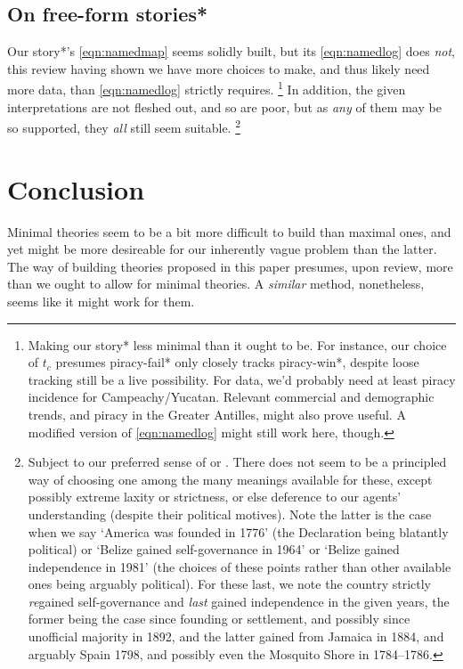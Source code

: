 	\subsection{On free-form stories*}
	\label{ss:onfreestories}
		Our story*'s \ref{eqn:namedmap} seems solidly built, but its \ref{eqn:namedlog} does \emph{not}, this review having shown we have more choices to make, and thus likely need more data, than \ref{eqn:namedlog} strictly requires.%
		\footnote{Making our story* less minimal than it ought to be. For instance, our choice of \(t_c\) presumes piracy-fail* only closely tracks piracy-win*, despite loose tracking still be a live possibility. For data, we'd probably need at least piracy incidence  for Campeachy/Yucatan. Relevant commercial and demographic trends, and piracy in the Greater Antilles, might also prove useful. A modified version of \ref{eqn:namedlog} might still work here, though.}
		In addition, the given interpretations are not fleshed out, and so are poor, but as \emph{any} of them may be so supported, they \emph{all} still seem suitable.%
		\footnote{Subject to our preferred sense of  or . There does not seem to be a principled way of choosing one among the many meanings available for these, except possibly extreme laxity or strictness, or else deference to our agents' understanding (despite their political motives). Note the latter is the case when we say `America was founded in 1776' (the Declaration being blatantly political) or `Belize gained self-governance in 1964' or `Belize gained independence in 1981' (the choices of these points rather than other available ones being arguably political). For these last, we note the country strictly \emph{re}gained self-governance and \emph{last} gained independence in the given years, the former being the case since founding or settlement, and possibly since unofficial majority in 1892, and the latter gained from Jamaica in 1884, and arguably Spain 1798, and possibly even the Mosquito Shore in 1784--1786.} %
%
%
%
\section{Conclusion}
\label{s:concl}
	Minimal theories seem to be a bit more difficult to build than maximal ones, and yet might be more desireable for our inherently vague problem than the latter. The way of building theories proposed in this paper presumes, upon review, more than we ought to allow for minimal theories. A \emph{similar} method, nonetheless, seems like it might work for them.
%
%
%
